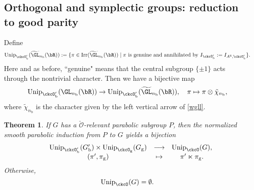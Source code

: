 \documentclass[12pt]{amsart}
\newcommand{\CO}{{\mathcal {O}}}
\newcommand{\g}{\mathfrak g}
\newcommand{\R}{\mathbb R}
\numberwithin{equation}{section}
\newtheorem{thm}{Theorem}[section]
\theoremstyle{remark}
\def\Irr{\mathrm{Irr}}
\def\Unip{\mathrm{Unip}}
\def\ckcOpb{\ckcO'_{\mathrm b}}
\begin{document}

 \subsection{Orthogonal and symplectic groups: reduction to good parity}
\label{secrgp0}
Define
 \[
      \Unip_{\ckcOpb}(\widetilde{ \GL}_{n_\mathrm b}(\bR)):=
       \{\pi\in \Irr(\widetilde{ \GL}_{n_\mathrm b}(\bR))\mid \pi \textrm{ is genuine  and annihilated by } I_{\ckcOpb}:= I_{A^\R, \ckcOpb}\}.
       \]
        Here and as before, ``genuine" means that the central subgroup $\{\pm 1\}$ acts through the nontrivial character.  Then we have a bijective map
 \[
    \Unip_{\ckcOpb}(\GL_{n_\mathrm b}(\bR))\rightarrow  \Unip_{\ckcOpb}(\widetilde{ \GL}_{n_\mathrm b}(\bR)), \quad \pi\mapsto \pi\otimes \tilde \chi_{n_\mathrm b},
 \]
 where $\tilde \chi_{n_\mathrm b}$ is the character given by the left vertical arrow of \eqref{wgll}.

\begin{thm}\label{reduction}
 If  $G$ has a $\check \CO$-relevant parabolic subgroup $P$, then the normalized smooth parabolic induction from $P$ to $G$ yields
   a bijection
   \[
    \begin{array}{rccc}
 &\Unip_{\ckcO'_{\mathrm b}}( G'_{\mathrm b}) \times   \Unip_{\ckcO_{\mathrm g}}( G_{\mathrm g})  &         \longrightarrow &\Unip_{\ckcO }(G), \\
                &   (\pi',\pi_\mathrm g) & \mapsto & \pi'\ltimes \pi_\mathrm g.
    \end{array}
 \]
  Otherwise,
  \[
    \Unip_{\ckcO}(G)=\emptyset.
  \]
\end{thm}
\end{document}
